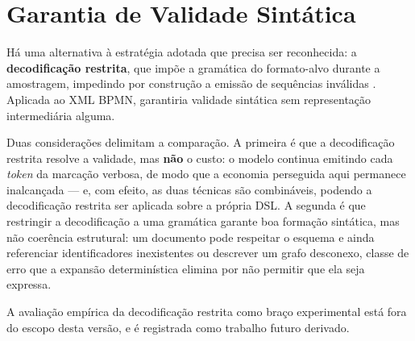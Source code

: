 \section{Garantia de Validade Sintática}
\label{sec:tr-validade}

Há uma alternativa à estratégia adotada que precisa ser reconhecida: a \textbf{decodificação restrita}, que impõe a gramática do formato-alvo durante a amostragem, impedindo por construção a emissão de sequências inválidas \cite{poesia2022synchromesh}. Aplicada ao XML BPMN, garantiria validade sintática sem representação intermediária alguma.

Duas considerações delimitam a comparação. A primeira é que a decodificação restrita resolve a validade, mas \textbf{não} o custo: o modelo continua emitindo cada \textit{token} da marcação verbosa, de modo que a economia perseguida aqui permanece inalcançada — e, com efeito, as duas técnicas são combináveis, podendo a decodificação restrita ser aplicada sobre a própria DSL. A segunda é que restringir a decodificação a uma gramática garante boa formação sintática, mas não coerência estrutural: um documento pode respeitar o esquema e ainda referenciar identificadores inexistentes ou descrever um grafo desconexo, classe de erro que a expansão determinística elimina por não permitir que ela seja expressa.

A avaliação empírica da decodificação restrita como braço experimental está fora do escopo desta versão, e é registrada como trabalho futuro derivado.
